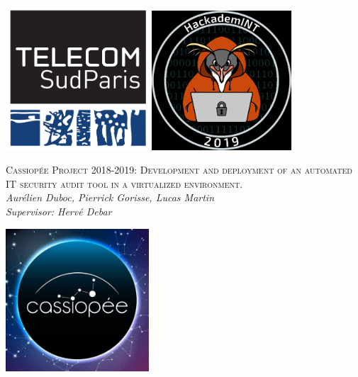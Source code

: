 
\thispagestyle{theme}

\newcolumntype{b}{X}
\usepackage{graphicx,lipsum}


\begin{center}

\includegraphics[width=0.40\textwidth]{images/logo.png}  \includegraphics[width=0.39\textwidth]{images/hackademint.png} \\ \vspace{2.5cm}

{\huge \textsc{Cassiopée Project 2018-2019: Development and deployment of an automated IT security audit tool in a virtualized environment.}} \\
  \textit{Aurélien Duboc, Pierrick Gorisse, Lucas Martin \\ Supervisor: Hervé Debar}

\end{center}

\vspace{2cm}
\begin{center}
\includegraphics[width=0.40\textwidth]{images/cassiopee.jpg}
\end{center}

